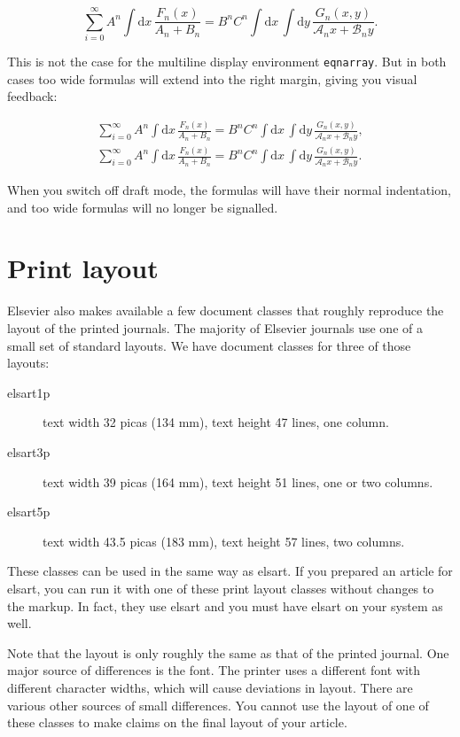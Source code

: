 \documentclass{elsart}
\begin{document}
\begin{description}
  \def\testformula{%
    \sum_{i=0}^{\infty}A^n\int \mathrm{d}x\, \frac{F_n(x)}{A_n + B_n} =
    B^n C^n \int\mathrm{d}x\,\int \mathrm{d}y\,
    \frac{G_n(x,y)}{\mathcal{A}_n{x} + \mathcal{B}_n{y}}
    }
  \overfullrule 5pt
  \mathindent\linewidth\relax
  \advance\mathindent-259pt
  \begin{equation}
    \label{eq:1}
    \testformula.
  \end{equation}

  This is not the case for the multiline display environment
  \texttt{eqnarray}. But in both cases too wide formulas will extend
  into the right margin, giving you visual feedback:

  \begin{eqnarray}
    \label{eq:2}
    \testformula,\nonumber\\
    \testformula.
  \end{eqnarray}

  When you switch off draft mode, the formulas will have their normal
  indentation, and too wide formulas will no longer be signalled.

\end{description}

\section{Print layout}
\label{printlayout}

Elsevier also makes available a few document classes that roughly
reproduce the layout of the printed journals. The majority of Elsevier
journals use one of a small set of standard layouts. We have document
classes for three of those layouts:

\begin{description}
\item[elsart1p] text width 32 picas (134 mm), text height 47 lines,
  one column.
\item[elsart3p] text width 39 picas (164 mm), text height 51 lines,
  one or two columns.
\item[elsart5p] text width 43.5 picas (183 mm), text height 57 lines,
  two columns.
\end{description}

These classes can be used in the same way as elsart. If you prepared
an article for elsart, you can run it with one of these print layout
classes without changes to the markup. In fact, they use elsart and
you must have elsart on your system as well.

Note that the layout is only roughly the same as that of the printed
journal. One major source of differences is the font. The printer uses
a different font with different character widths, which will cause
deviations in layout. There are various other sources of small
differences. You cannot use the layout of one of these classes to make
claims on the final layout of your article.
\end{document}
